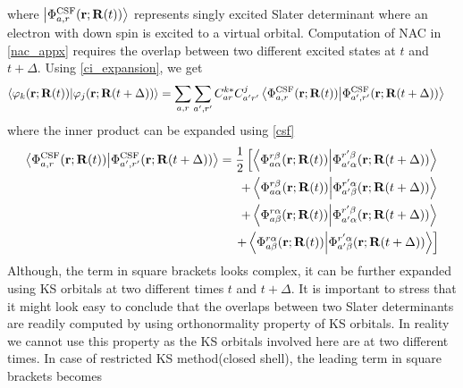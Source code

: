 where $\ket{\Phi_{a,r}^{\text{CSF}}(\mathbf{r};\mathbf{R}(t))}$ represents singly excited Slater determinant where an electron with down spin is excited to a virtual orbital. Computation of NAC in \eqref{nac_appx} requires the overlap between two different excited states at $t$ and $t+\Delta$. Using \eqref{ci_expansion}, we get
\begin{align}
    \ip{\varphi_k(\mathbf{r};\mathbf{R}(t))}{\varphi_j(\mathbf{r};\mathbf{R}(t+\Delta))} &= \sum_{a,r}\sum_{a',r'}C^{k*}_{ar}C^j_{a'r'} \ip{\Phi_{a,r}^{\text{CSF}}(\mathbf{r};\mathbf{R}(t))}{\Phi_{a',r'}^{\text{CSF}}(\mathbf{r};\mathbf{R}(t+\Delta))}
\end{align}
where the inner product can be expanded using \eqref{csf}
\begin{align}
    \ip{\Phi_{a,r}^{\text{CSF}}(\mathbf{r};\mathbf{R}(t))}{\Phi_{a',r'}^{\text{CSF}}(\mathbf{r};\mathbf{R}(t+\Delta))} = \frac{1}{2}\left[ \ip{\Phi_{a\alpha}^{r\beta}(\mathbf{r};\mathbf{R}(t))}{\Phi_{a'\alpha}^{r'\beta}(\mathbf{r};\mathbf{R}(t+\Delta))} \nonumber \right.\\\left.
    + \ip{\Phi_{a\alpha}^{r\beta}(\mathbf{r};\mathbf{R}(t))}{\Phi_{a'\beta}^{r'\alpha}(\mathbf{r};\mathbf{R}(t+\Delta))} \nonumber \right.\\\left.
    + \ip{\Phi_{a\beta}^{r\alpha}(\mathbf{r};\mathbf{R}(t))}{\Phi_{a'\alpha}^{r'\beta}(\mathbf{r};\mathbf{R}(t+\Delta))} \nonumber \right.\\\left.
    + \ip{\Phi_{a\beta}^{r\alpha}(\mathbf{r};\mathbf{R}(t))}{\Phi_{a'\beta}^{r'\alpha}(\mathbf{r};\mathbf{R}(t+\Delta))}
    \right]
\end{align}
Although, the term in square brackets looks complex, it can be further expanded using KS orbitals at two different times $t$ and $t+\Delta$. It is important to stress that it might look easy to conclude that the overlaps between two Slater determinants are readily computed by using orthonormality property of KS orbitals. In reality we cannot use this property as the KS orbitals involved here are at two different times.
In case of restricted KS method(closed shell), the leading term in square brackets becomes\cite{werner_et_al}
